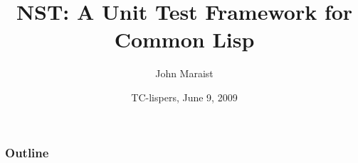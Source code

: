 \documentclass{beamer}
\title{NST: A Unit Test Framework for Common Lisp}
\author{John Maraist}
\institute[SIFT, LLC]{Smart Information Flow Technologies (SIFT, LLC)}
\date{TC-lispers, June 9, 2009}
\begin{document}
\begin{frame}
  \titlepage
\end{frame}

\begin{frame}
  \frametitle{Outline}
  \tableofcontents
\end{frame}





\end{document}

